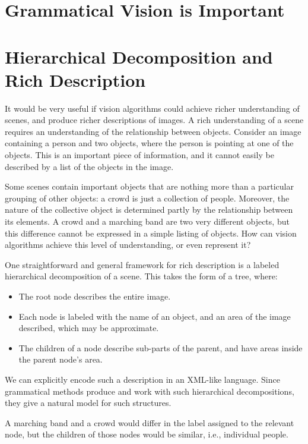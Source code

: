 \section{Grammatical Vision is Important}

\section{Hierarchical Decomposition and Rich Description}
\label{sec-annotation}

It would be very useful if vision algorithms could achieve richer
understanding of scenes, and produce richer descriptions of images. A
rich understanding of a scene requires an understanding of the
relationship between objects. Consider an image containing a person
and two objects, where the person is pointing at one of the
objects. This is an important piece of information, and it cannot
easily be described by a list of the objects in the image.

Some scenes contain important objects that are nothing more than a
particular grouping of other objects: a crowd is just a collection of
people. Moreover, the nature of the collective object is determined
partly by the relationship between its elements. A crowd and a
marching band are two very different objects, but this difference
cannot be expressed in a simple listing of objects. How can vision
algorithms achieve this level of understanding, or even represent it?

One straightforward and general framework for rich description is a
labeled hierarchical decomposition of a
scene. \cite{zhu-mumford} This takes the form of a tree, where:
\begin{itemize}
\item The root node describes the entire image.
\item Each node is labeled with the name of an object, and an area of
  the image described, which may be approximate. 
\item The children of a node describe sub-parts of the parent, and
  have areas inside the parent node's area.
\end{itemize}
We can explicitly encode such a description in an XML-like language.
Since grammatical methods produce and work with such hierarchical
decompositions, they give a natural model for such structures. 

A marching band and a crowd would differ in the label assigned to the
relevant node, but the children of those nodes would be similar, i.e.,
individual people.

